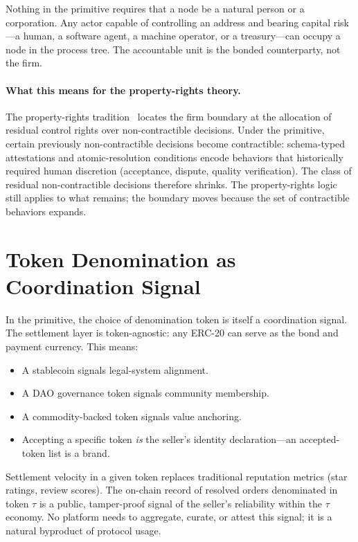 \documentclass[11pt,a4paper]{article}
\theoremstyle{definition}
\theoremstyle{remark}
\begin{document}
Nothing in the primitive requires that a node be a natural person or
a corporation. Any actor capable of controlling an address and
bearing capital risk---a human, a software agent, a machine operator,
or a treasury---can occupy a node in the process tree. The
accountable unit is the bonded counterparty, not the firm.

\paragraph{What this means for the property-rights theory.}
The property-rights tradition~\citep{hart1995} locates the firm
boundary at the allocation of residual control rights over
non-contractible decisions. Under the primitive, certain previously
non-contractible decisions become contractible: schema-typed
attestations and atomic-resolution conditions encode behaviors that
historically required human discretion (acceptance, dispute,
quality verification). The class of residual non-contractible
decisions therefore shrinks. The property-rights logic still applies
to what remains; the boundary moves because the set of contractible
behaviors expands.

\section{Token Denomination as Coordination Signal}
\label{sec:token}

In the primitive, the choice of denomination token is itself a
coordination signal. The settlement layer is token-agnostic: any
ERC-20 can serve as the bond and payment currency. This means:

\begin{itemize}
  \item A stablecoin signals legal-system alignment.
  \item A DAO governance token signals community membership.
  \item A commodity-backed token signals value anchoring.
  \item Accepting a specific token \emph{is} the seller's identity
    declaration---an accepted-token list is a brand.
\end{itemize}

Settlement velocity in a given token replaces traditional reputation
metrics (star ratings, review scores). The on-chain record of resolved
orders denominated in token $\tau$ is a public, tamper-proof signal of
the seller's reliability within the $\tau$ economy. No platform needs
to aggregate, curate, or attest this signal; it is a natural
byproduct of protocol usage.
\end{document}

